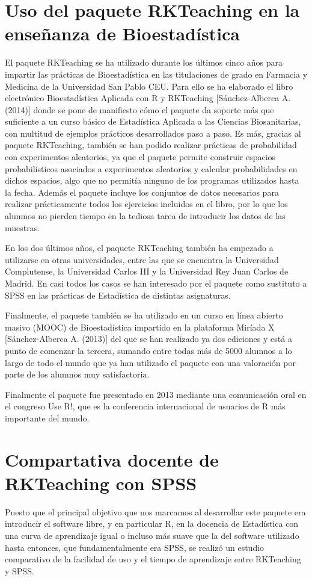 \documentclass[10pt,twoside,spanish]{article}
\numberwithin{equation}{section}
\begin{document}
\section{Uso del paquete RKTeaching en la enseñanza de Bioestadística}
El paquete RKTeaching se ha utilizado durante los últimos cinco años para impartir las prácticas de Bioestadística en las titulaciones de
grado en Farmacia y Medicina de la Universidad San Pablo CEU. 
Para ello se ha elaborado el libro electrónico Bioestadística Aplicada con R y RKTeaching [Sánchez-Alberca A. (2014)] donde se pone
de manifiesto cómo el paquete da soporte más que suficiente a un curso básico de Estadística Aplicada a las Ciencias Biosanitarias, con
multitud de ejemplos prácticos desarrollados paso a paso. 
Es más, gracias al paquete RKTeaching, también se han podido realizar prácticas de probabilidad con experimentos aleatorios, ya que el
paquete permite construir espacios probabilísticos asociados a experimentos aleatorios y calcular probabilidades en dichos espacios, algo
que no permitía ninguno de los programas utilizados hasta la fecha.
Además el paquete incluye los conjuntos de datos necesarios para
realizar prácticamente todos los ejercicios incluidos en el libro, por lo que los alumnos no pierden tiempo en la tediosa tarea de introducir los datos de las muestras.

En los dos últimos años, el paquete RKTeaching también ha empezado a utilizarse en otras universidades, entre las que se encuentra la
Universidad Complutense, la Universidad Carlos III y la Universidad Rey Juan Carlos de Madrid.
En casi todos los casos se han interesado por el
paquete como sustituto a SPSS en las prácticas de Estadística de distintas asignaturas.

Finalmente, el paquete también se ha utilizado en un curso en línea abierto masivo (MOOC) de Bioestadística impartido en la plataforma
Miríada X [Sánchez-Alberca A. (2013)] del que se han realizado ya dos ediciones y está a punto de comenzar la tercera, sumando entre todas
más de 5000 alumnos a lo largo de todo el mundo que ya han utilizado el paquete con una valoración por parte de los alumnos muy satisfactoria.

Finalmente el paquete fue presentado en 2013 mediante una comunicación oral en el congreso Use R!, que es la conferencia internacional de
usuarios de R más importante del mundo. 
  

\section{Compartativa docente de RKTeaching con SPSS}
Puesto que el principal objetivo que nos marcamos al desarrollar este paquete era introducir el software libre, y en particular R, en la
docencia de Estadística con una curva de aprendizaje igual o incluso más suave que la del software utilizado hasta entonces, que
fundamentalmente era SPSS, se realizó un estudio comparativo de la facilidad de uso y el tiempo de aprendizaje entre RKTeaching y SPSS.
\end{document}
